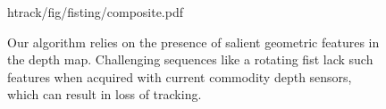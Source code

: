 \begin{figure}[t]
\centering
\begin{overpic} 
[width=\linewidth]
{htrack/fig/fisting/composite.pdf}
\putfilename
\end{overpic}
\caption{
% 
Our algorithm relies on the presence of salient geometric features in the depth map. Challenging sequences like a rotating fist lack such features when acquired with current commodity depth sensors, which can result in loss of tracking. 
% 
}
\label{fig:fisting}
\end{figure}
